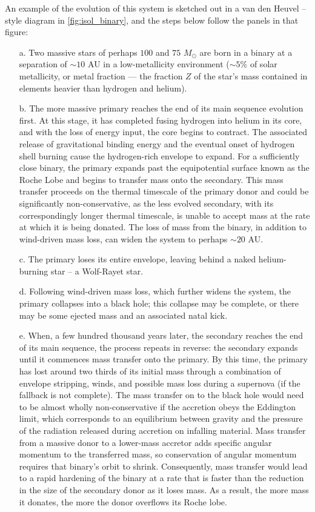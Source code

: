 \documentclass[review]{elsarticle}
\begin{document}
An example of the evolution of this system is sketched out in a van den Heuvel -- style diagram in \autoref{fig:isol_binary}, and the steps below follow the panels in that figure:
\begin{enumerate}  
\item[a.] Two massive stars of perhaps $100$ and $75$ $M_{\odot}$ are born in a binary at a separation of $\sim 10$ AU in a low-metallicity environment ($\sim 5\%$ of solar metallicity, or metal fraction --- the fraction $Z$ of the star's mass contained in elements heavier than hydrogen and helium).  
\item[b.] The more massive primary reaches the end of its main sequence evolution first.  At this stage, it has completed fusing hydrogen into helium in its core, and with the loss of energy input, the core begins to contract.  The associated release of gravitational binding energy and the eventual onset of hydrogen shell burning cause the hydrogen-rich envelope to expand.  For a sufficiently close binary, the primary expands past the equipotential surface known as the Roche Lobe and begins to transfer mass onto the secondary.  This mass transfer proceeds on the thermal timescale of the primary donor and could be significantly non-conservative, as the less evolved secondary, with its correspondingly longer thermal timescale, is unable to accept mass at the rate at which it is being donated.  The loss of mass from the binary, in addition to wind-driven mass loss, can widen the system to perhaps $\sim 20$ AU.  
\item[c.] The primary loses its entire envelope, leaving behind a naked helium-burning star -- a Wolf-Rayet star.  
\item[d.] Following wind-driven mass loss, which further widens the system, the primary collapses into a black hole; this collapse may be complete, or there may be some ejected mass and an associated natal kick.  
\item[e.] When, a few hundred thousand years later, the secondary reaches the end of its main sequence, the process repeats in reverse: the secondary expands until it commences mass transfer onto the primary.  By this time, the primary has lost around two thirds of its initial mass through a combination of envelope stripping, winds, and possible mass loss during a supernova (if the fallback is not complete).  The mass transfer on to the black hole would need to be almost wholly non-conservative if the accretion obeys the Eddington limit, which corresponds to an equilibrium between gravity and the pressure of the radiation released during accretion on infalling material.  Mass transfer from a massive donor to a lower-mass accretor adds specific angular momentum to the transferred mass, so conservation of angular momentum requires that binary's orbit to shrink.  Consequently, mass transfer would lead to a rapid hardening of the binary at a rate that is faster than the reduction in the size of the secondary donor as it loses mass.  As a result, the more mass it donates, the more the donor overflows its Roche lobe.  

\end{enumerate}
\end{document}
